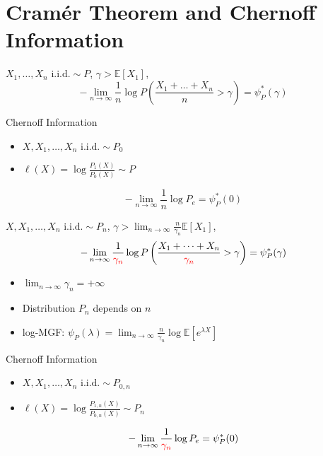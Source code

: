 \documentclass{beamer}
\begin{document}
\section{Cramér Theorem and Chernoff Information}
\begin{frame}
\begin{theorem}
$X_1, \dots, X_n  \textrm{ i.i.d.} \sim P$, $\gamma > \mathbb{E}[X_1]$, 
\begin{equation}
-\lim_{n\to \infty}\frac{1}{n} \log P\left(\frac{X_1+ \dots + X_n}{n} > \gamma \right)
= \psi_P^*(\gamma)
\end{equation}
\end{theorem}
Chernoff Information
\begin{itemize}
\item $X, X_1, \dots, X_n \textrm{ i.i.d.} \sim P_0$
\item $\ell(X) = \log\frac{P_1(X)}{P_0(X)} \sim P$
\end{itemize}
\begin{equation}
-\lim_{n\to\infty} \frac{1}{n}\log P_e = \psi^*_P(0)
\end{equation}
\end{frame}
\begin{frame}
\begin{theorem}
$X, X_1, \dots, X_n  \textrm{ i.i.d.} \sim P_n$, $\gamma > \lim_{n\to\infty} \frac{n}{\gamma_n}\mathbb{E}[X_1]$, 
\begin{equation}
-\lim_{n\to \infty}\frac{1}{\textcolor{red}{\gamma_n}} \log P\left(\frac{X_1+ \dots + X_n}{\textcolor{red}{\gamma_n}} > \gamma \right)
= \psi_P^*(\gamma)
\end{equation}
\begin{itemize}
\item $\lim_{n\to\infty} \gamma_n = +\infty$
\item Distribution $P_n$ depends on $n$
\item log-MGF: $\psi_P(\lambda)=\lim_{n\to\infty} \frac{n}{\gamma_n} \log \mathbb{E}[e^{\lambda X}]$
\end{itemize}
\end{theorem}
Chernoff Information
\begin{itemize}
\item $X, X_1, \dots, X_n \textrm{ i.i.d.} \sim P_{0,n}$
\item $\ell(X) = \log\frac{P_{1,n}(X)}{P_{0,n}(X)} \sim P_n$
\end{itemize}
\begin{equation*}
-\lim_{n\to\infty} \frac{1}{\textcolor{red}{\gamma_n}}\log P_e = \psi^*_P(0)
\end{equation*}
\end{frame}
\end{document}
